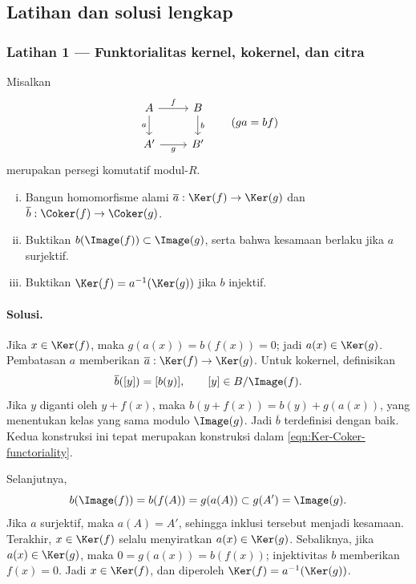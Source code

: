 \subsection*{Latihan dan solusi lengkap}

\subsubsection*{Latihan 1 --- Funktorialitas kernel, kokernel, dan citra}
\hypertarget{o014.mastery.diagram-chasing.001.ex01}{ }
\label{mastery:diagram-chasing-001-ex01}

Misalkan
\[
\begin{tikzcd}
	A \arrow[r, "f"] \arrow[d, "a"'] & B \arrow[d, "b"] \\
	A' \arrow[r, "g"'] & B'
\end{tikzcd}
\qquad (ga=bf)
\]
merupakan persegi komutatif modul-$R$.
\begin{enumerate}[(i)]
	\item Bangun homomorfisme alami
	$\overline a:\Ker(f)\to\Ker(g)$ dan
	$\overline b:\Coker(f)\to\Coker(g)$.
	\item Buktikan $b(\Image(f))\subset\Image(g)$, serta bahwa
	kesamaan berlaku jika $a$ surjektif.
	\item Buktikan $\Ker(f)=a^{-1}(\Ker(g))$ jika $b$ injektif.
\end{enumerate}

\paragraph{Solusi.}
\hypertarget{o014.mastery.diagram-chasing.001.sol01}{ }
Jika $x\in\Ker(f)$, maka $g(a(x))=b(f(x))=0$; jadi
$a(x)\in\Ker(g)$. Pembatasan $a$ memberikan
$\overline a:\Ker(f)\to\Ker(g)$. Untuk kokernel, definisikan
\[
	\overline b([y])=[b(y)], \qquad [y]\in B/\Image(f).
\]
Jika $y$ diganti oleh $y+f(x)$, maka
$b(y+f(x))=b(y)+g(a(x))$, yang menentukan kelas yang sama modulo
$\Image(g)$. Jadi $\overline b$ terdefinisi dengan baik. Kedua konstruksi
ini tepat merupakan konstruksi dalam \eqref{eqn:Ker-Coker-functoriality}.

Selanjutnya,
\[
	b(\Image(f))=b(f(A))=g(a(A))\subset g(A')=\Image(g).
\]
Jika $a$ surjektif, maka $a(A)=A'$, sehingga inklusi tersebut menjadi
kesamaan. Terakhir, $x\in\Ker(f)$ selalu menyiratkan
$a(x)\in\Ker(g)$. Sebaliknya, jika $a(x)\in\Ker(g)$, maka
$0=g(a(x))=b(f(x))$; injektivitas $b$ memberikan $f(x)=0$. Jadi
$x\in\Ker(f)$, dan diperoleh
$\Ker(f)=a^{-1}(\Ker(g))$.


